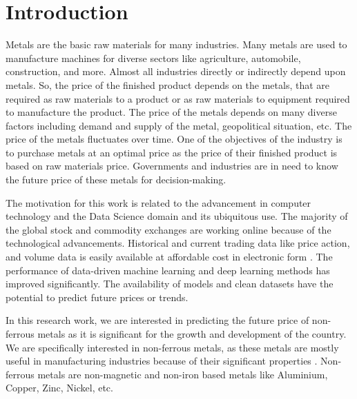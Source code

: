 \documentclass[preprint,12pt]{elsarticle}
\begin{document}



\section{Introduction}
Metals are the basic raw materials for many industries. Many metals are used to manufacture machines for diverse sectors like agriculture, automobile, construction, and more. Almost all industries directly or indirectly depend upon metals. So, the price of the finished product depends on the metals, that are required as raw materials to a product or as raw materials to equipment required to manufacture the product. The price of the metals depends on many diverse factors including demand and supply of the metal, geopolitical situation, etc. The price of the metals fluctuates over time. One of the objectives of the industry is to purchase metals at an optimal price as the price of their finished product is based on raw materials price. Governments and industries are in need to know the future price of these metals for decision-making.
\par The motivation for this work is related to the advancement in computer technology and the Data Science domain and its ubiquitous use. The majority of the global stock and commodity exchanges are working online because of the technological advancements. Historical and current trading data like price action, and volume data is easily available at affordable cost in electronic form \cite{chakole2023tutorial}. The performance of data-driven machine learning and deep learning methods\cite{chakole2021convolutional} has improved significantly. The availability of models and clean datasets have the potential to predict future prices or trends.
\par In this research work, we are interested in predicting the future price of non-ferrous metals as it is significant for the growth and development of the country. We are specifically interested in non-ferrous metals, as these metals are mostly useful in manufacturing industries because of their significant properties \cite{watkins2004econometric}. Non-ferrous metals are non-magnetic and non-iron based metals like Aluminium, Copper, Zinc, Nickel, etc.
\end{document}
